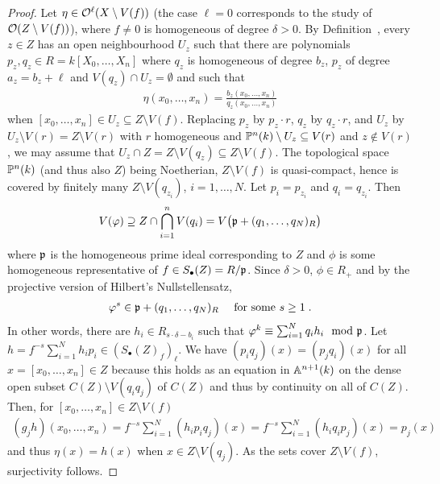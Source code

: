 \documentclass[a4paper,parskip=half,numbers=enddot, DIV=12]{scrreprt}
\begin{document}
\begin{proof}
    Let $\eta\in \mathcal{O}^\ell(X\setminus V(f))$ (the case $\ell=0$ corresponds to the study of $\mathcal{O}(Z\setminus V(f))$), where $f\neq 0$ is homogeneous of degree $\delta >0$. By Definition~, every $z\in Z$ has an open neighbourhood $U_z$ such that there are polynomials $p_z,q_z\in R=k[X_0,\ldots, X_n]$ where $q_z$ is homogeneous of degree $b_z$, $p_z$ of degree $a_z = b_z+\ell$ and $V(q_z)\cap U_z = \emptyset$ and such that 
    \begin{align*}
        \eta(x_0,\ldots, x_n) = \frac{b_z(x_0,\ldots, x_n)}{q_z(x_0,\ldots, x_n)}
    \end{align*}
    when $[x_0,\ldots, x_n]\in U_z\subseteq Z\setminus V(f)$. Replacing $p_z$ by $p_z\cdot r$, $q_z$ by $q_z\cdot r$, and $U_z$ by $U_z\setminus V(r) = Z\setminus V(r)$ with $r$ homogeneous and $\mathbb{P}^n(k)\setminus U_z \subseteq V(r)$ and $z\not \in V(r)$, we may assume that $U_z\cap Z = Z\setminus V(q_z)\subseteq Z\setminus V(f)$. The topological space $\mathbb{P}^n(k)$ (and thus also $Z$) being Noetherian, $Z\setminus V(f)$ is quasi-compact, hence is covered by finitely many $Z\setminus V(q_{z_i})$, $i=1,\ldots,N$. Let $p_i= p_{z_i}$ and $q_i = q_{z_i}$. Then 
    \begin{align*}
        V(\varphi) \supseteq Z\cap \bigcap_{i=1}^n V(q_i) = V\big(\mathfrak{p}+ (q_1,\ldots, q_N)_R\big)
    \end{align*}
    where $\mathfrak{p}$ is the homogeneous prime ideal corresponding to $Z$ and $\phi$ is some homogeneous representative of $f\in S_\bullet(Z) = R/\mathfrak{p}$. Since $\delta >0$, $\phi\in R_+$ and by the projective version of Hilbert's Nullstellensatz, 
    \begin{align*}
        \varphi^s \in  \mathfrak{p}+(q_1,\ldots,q_N)_R\quad\text{ for some }s\geq 1\;.
    \end{align*}
    In other words, there are $h_i\in R_{s\cdot \delta-b_i}$ such that $\varphi^k\equiv \sum_{i=1}^N q_ih_i \mod{\mathfrak{p}}$. Let $h= f^{-s}\sum_{i=1}^N h_ip_i\in (S_\bullet(Z)_f)_\ell$. We have $(p_i q_j)(x) = (p_jq_i)(x)$ for all $x=[x_0,\ldots,x_n]\in Z$ because this holds as an equation in $\mathbb{A}^{n+1}(k)$ on the dense open subset $C(Z)\setminus V(q_iq_j)$ of $C(Z)$ and thus by continuity on all of $C(Z)$. Then, for $[x_0,\ldots, x_n]\in Z\setminus V(f)$ 
    \begin{align*}
        (g_jh)(x_0,\ldots, x_n) = f^{-s}\sum_{i=1}^N (h_ip_iq_j)(x)= f^{-s}\sum_{i=1}^N (h_iq_ip_j)(x) = p_j(x)
    \end{align*}
    and thus $\eta(x) = h(x)$ when $x\in Z\setminus V(q_j)$. As the sets cover $Z\setminus V(f)$, surjectivity follows.
\end{proof}
\end{document}
